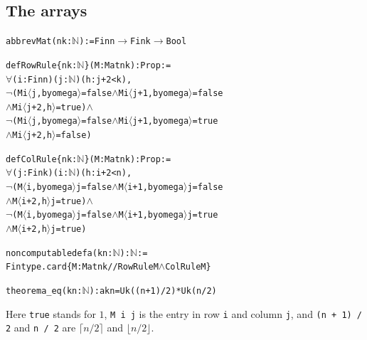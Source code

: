 \documentclass[11pt]{amsart}
\theoremstyle{definition}
\newcommand{\lean}[1]{\texttt{#1}}
\newcommand{\NN}{\mathbb{N}}
\begin{document}
\subsection*{The arrays}
\begin{alltt}\small
abbrev Mat (n k : \(\NN\)) := Fin n \(\to\) Fin k \(\to\) Bool

def RowRule \{n k : \(\NN\)\} (M : Mat n k) : Prop :=
  \(\forall\) (i : Fin n) (j : \(\NN\)) (h : j + 2 < k),
    \(\lnot\) (M i \(\langle\)j, by omega\(\rangle\) = false \(\land\) M i \(\langle\)j + 1, by omega\(\rangle\) = false
        \(\land\) M i \(\langle\)j + 2, h\(\rangle\) = true) \(\land\)
    \(\lnot\) (M i \(\langle\)j, by omega\(\rangle\) = false \(\land\) M i \(\langle\)j + 1, by omega\(\rangle\) = true
        \(\land\) M i \(\langle\)j + 2, h\(\rangle\) = false)

def ColRule \{n k : \(\NN\)\} (M : Mat n k) : Prop :=
  \(\forall\) (j : Fin k) (i : \(\NN\)) (h : i + 2 < n),
    \(\lnot\) (M \(\langle\)i, by omega\(\rangle\) j = false \(\land\) M \(\langle\)i + 1, by omega\(\rangle\) j = false
        \(\land\) M \(\langle\)i + 2, h\(\rangle\) j = true) \(\land\)
    \(\lnot\) (M \(\langle\)i, by omega\(\rangle\) j = false \(\land\) M \(\langle\)i + 1, by omega\(\rangle\) j = true
        \(\land\) M \(\langle\)i + 2, h\(\rangle\) j = true)

noncomputable def a (k n : \(\NN\)) : \(\NN\) :=
  Fintype.card \{M : Mat n k // RowRule M \(\land\) ColRule M\}

theorem a_eq (k n : \(\NN\)) : a k n = U k ((n + 1) / 2) * U k (n / 2)
\end{alltt}
Here \lean{true} stands for $1$, \lean{M i j} is the entry in row \lean{i} and column \lean{j}, and \lean{(n + 1) / 2} and \lean{n / 2} are $\lceil n/2\rceil$ and $\lfloor n/2\rfloor$.
\end{document}
